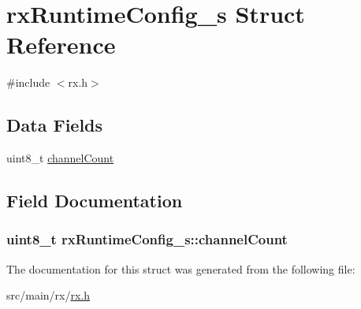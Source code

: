 \hypertarget{structrxRuntimeConfig__s}{\section{rx\+Runtime\+Config\+\_\+s Struct Reference}
\label{structrxRuntimeConfig__s}
}


{\ttfamily \#include $<$rx.\+h$>$}

\subsection*{Data Fields}
\begin{DoxyCompactItemize}
\item 
uint8\+\_\+t \hyperlink{structrxRuntimeConfig__s_a7419eea42c3c89338f73490757f00f2a}{channel\+Count}
\end{DoxyCompactItemize}


\subsection{Field Documentation}
\hypertarget{structrxRuntimeConfig__s_a7419eea42c3c89338f73490757f00f2a}{
\subsubsection[{channel\+Count}]{\setlength{\rightskip}{0pt plus 5cm}uint8\+\_\+t rx\+Runtime\+Config\+\_\+s\+::channel\+Count}}\label{structrxRuntimeConfig__s_a7419eea42c3c89338f73490757f00f2a}


The documentation for this struct was generated from the following file\+:\begin{DoxyCompactItemize}
\item 
src/main/rx/\hyperlink{rx_2rx_8h}{rx.\+h}\end{DoxyCompactItemize}
